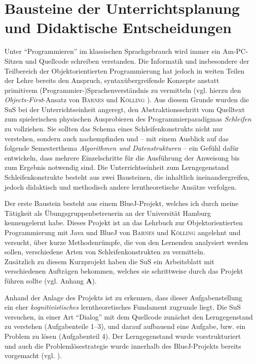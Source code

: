 \documentclass[paper=a4, DIV=13, BCOR=8mm, oneside=on, onecolumn=on, open = any, titlepage =on, parskip =half-, headsepline = on, footsepline = off, chapterprefix = on, sectionprefix = on, appendixprefix = off, fontsize = 12pt, numbers = noenddot, abstract = off]{scrreprt}
\begin{document}
\par \singlespacing
 \section{Bausteine der Unterrichtsplanung und Didaktische Entscheidungen}
\onehalfspacing
Unter "`Programmieren"' im klassischen Sprachgebrauch wird immer ein Am-PC-Sitzen und Quellcode schreiben verstanden. Die Informatik und insbesondere der Teilbereich der Objektorientierten Programmierung hat jedoch in weiten Teilen der Lehre bereits den Anspruch, syn{\-}tax{\-}übergreifende Konzepte anstatt primitivem (Programmier-){\-}Sprachenverständnis zu vermitteln (vgl. hierzu den \emph{Objects-First}-Ansatz von \textsc{Barnes} und \textsc{Kölling} \cite{barnes:03}). Aus diesem Grunde wurden die SuS bei der Unterrichtseinheit angeregt, den Abstraktionsschritt vom Quelltext zum spielerischen physischen Ausprobieren des Programmierparadigmas \emph{Schleifen} zu vollziehen. Sie sollten das Schema eines Schleifenkonstrukts nicht nur verstehen, sondern auch nachempfinden und -- mit einem Ausblick auf das folgende Semesterthema \emph{Algorithmen und Datenstrukturen} -- ein Gefühl dafür entwickeln, dass mehrere Einzelschritte für die Ausführung der Anweisung bis zum Ergebnis notwendig sind.  
Die Unterrichtseinheit zum Lerngegenstand Schleifenkonstrukte besteht aus zwei Bausteinen, die inhaltlich ineinandergreifen, jedoch didaktisch und methodisch andere lerntheoretische Ansätze verfolgen. 

Der erste Baustein besteht aus einem BlueJ-Projekt, welches ich durch meine Tätigkeit als Übungsgruppenbetreuerin an der Universität Hamburg kennengelernt habe. Dieses Projekt ist an das Lehrbuch zur Objektorientierten Programmierung mit Java und BlueJ von \textsc{Barnes} und \textsc{Kölling} \cite{barnes:03} angelehnt und versucht, über kurze Methodenrümpfe, die von den Lernenden analysiert werden sollen, verschiedene Arten von Schleifenkonstrukten zu vermitteln.\\
Zusätzlich zu diesem Kurzprojekt haben die SuS ein Arbeitsblatt mit verschiedenen Aufträgen bekommen, welches sie schrittweise durch das Projekt führen sollte (vgl. Anhang \textbf{A}).

Anhand der Anlage des Projekts ist zu erkennen, dass dieser Aufgabenstellung ein eher \emph{kognitivistisches} lerntheoretisches Fundament zugrunde liegt. Die SuS versuchen, in einer Art "`Dialog"' mit dem Quellcode zunächst den Lerngegenstand zu verstehen (Aufgabenteile 1--3), und darauf aufbauend eine Aufgabe, bzw. ein Problem zu lösen (Aufgabenteil 4). Der Lerngegenstand wurde vorstrukturiert und auch die Problemlösestrategie wurde innerhalb des BlueJ-Projekts bereits vorgemacht (vgl. \cite[S.219]{schwarzer:07}).
\end{document}
